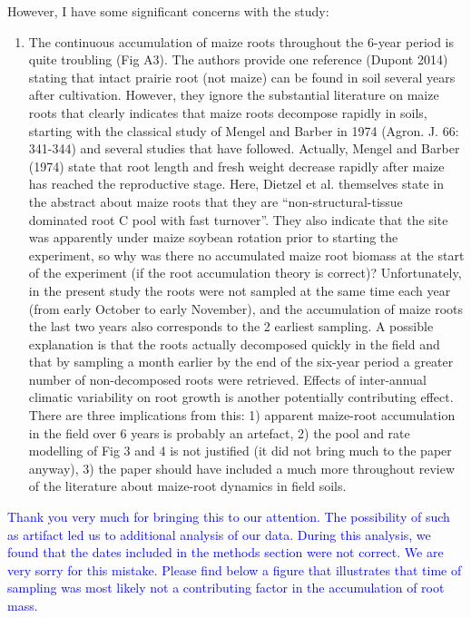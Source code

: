\documentclass[]{article}
\providecommand{\tightlist}{%
  \setlength{\itemsep}{0pt}\setlength{\parskip}{0pt}}
\begin{document}
However, I have some significant concerns with the study:

\begin{enumerate}
\def\labelenumi{\arabic{enumi})}
\tightlist
\item
  The continuous accumulation of maize roots throughout the 6-year
  period is quite troubling (Fig A3). The authors provide one reference
  (Dupont 2014) stating that intact prairie root (not maize) can be
  found in soil several years after cultivation. However, they ignore
  the substantial literature on maize roots that clearly indicates that
  maize roots decompose rapidly in soils, starting with the classical
  study of Mengel and Barber in 1974 (Agron. J. 66: 341-344) and several
  studies that have followed. Actually, Mengel and Barber (1974) state
  that root length and fresh weight decrease rapidly after maize has
  reached the reproductive stage. Here, Dietzel et al. themselves state
  in the abstract about maize roots that they are
  ``non-structural-tissue dominated root C pool with fast turnover''.
  They also indicate that the site was apparently under maize soybean
  rotation prior to starting the experiment, so why was there no
  accumulated maize root biomass at the start of the experiment (if the
  root accumulation theory is correct)? Unfortunately, in the present
  study the roots were not sampled at the same time each year (from
  early October to early November), and the accumulation of maize roots
  the last two years also corresponds to the 2 earliest sampling. A
  possible explanation is that the roots actually decomposed quickly in
  the field and that by sampling a month earlier by the end of the
  six-year period a greater number of non-decomposed roots were
  retrieved. Effects of inter-annual climatic variability on root growth
  is another potentially contributing effect. There are three
  implications from this: 1) apparent maize-root accumulation in the
  field over 6 years is probably an artefact, 2) the pool and rate
  modelling of Fig 3 and 4 is not justified (it did not bring much to
  the paper anyway), 3) the paper should have included a much more
  throughout review of the literature about maize-root dynamics in field
  soils.
\end{enumerate}

\textcolor{blue}{Thank you very much for bringing this to our attention. The possibility of such as artifact led us to additional analysis of our data. During this analysis, we found that the dates included in the methods section were not correct. We are very sorry for this mistake. Please find below a figure that illustrates that time of sampling was most likely not a contributing factor in the accumulation of root mass.}
\end{document}
